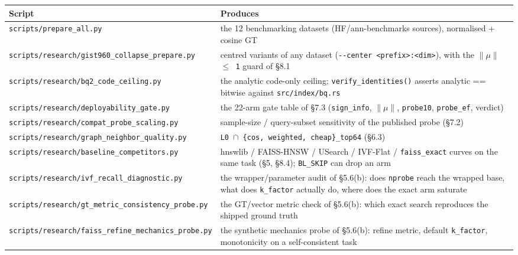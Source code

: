 \documentclass[
  10pt,
]{article}
\newcounter{none} %
\begin{document}
{\def\LTcaptype{none} %
\begin{longtable}[]{@{}
  >{\raggedright\arraybackslash}p{}
  >{\raggedright\arraybackslash}p{}@{}}
\toprule\noalign{}
\begin{minipage}[b]{\linewidth}\raggedright
Script
\end{minipage} & \begin{minipage}[b]{\linewidth}\raggedright
Produces
\end{minipage} \\
\midrule\noalign{}
\endhead
\bottomrule\noalign{}
\endlastfoot
\texttt{scripts/prepare\_all.py} & the 12 benchmarking datasets
(HF/ann-benchmarks sources), normalised + cosine GT \\
\texttt{scripts/research/gist960\_collapse\_prepare.py} & centred
variants of any dataset
(\texttt{-\/-center\ \textless{}prefix\textgreater{}:\textless{}dim\textgreater{}}),
with the \texttt{$\|$$\mu$$\|$\ $\leq$\ 1} guard of §8.1 \\
\texttt{scripts/research/bq2\_code\_ceiling.py} & the analytic code-only
ceiling; \texttt{verify\_identities()} asserts analytic == bitwise
against \texttt{src/index/bq.rs} \\
\texttt{scripts/research/deployability\_gate.py} & the 22-arm gate table
of §7.3 (\texttt{sign\_info}, \texttt{$\|$$\mu$$\|$}, \texttt{probe10},
\texttt{probe\_ef}, verdict) \\
\texttt{scripts/research/compat\_probe\_scaling.py} & sample-size /
query-subset sensitivity of the published probe (§7.2) \\
\texttt{scripts/research/graph\_neighbor\_quality.py} &
\texttt{L0\ $\cap$\ \{cos,\ weighted,\ cheap\}\_top64} (§6.3) \\
\texttt{scripts/research/baseline\_competitors.py} & hnswlib /
FAISS-HNSW / USearch / IVF-Flat / \texttt{faiss\_exact} curves on the
same task (§5, §8.4); \texttt{BL\_SKIP} can drop an arm \\
\texttt{scripts/research/ivf\_recall\_diagnostic.py} & the
wrapper/parameter audit of §5.6(b): does \texttt{nprobe} reach the
wrapped base, what does \texttt{k\_factor} actually do, where does the
exact arm saturate \\
\texttt{scripts/research/gt\_metric\_consistency\_probe.py} & the
GT/vector metric check of §5.6(b): which exact search reproduces the
shipped ground truth \\
\texttt{scripts/research/faiss\_refine\_mechanics\_probe.py} & the
synthetic mechanics probe of §5.6(b): refine metric, default
\texttt{k\_factor}, monotonicity on a self-consistent task \\
\end{longtable}
}
\end{document}
